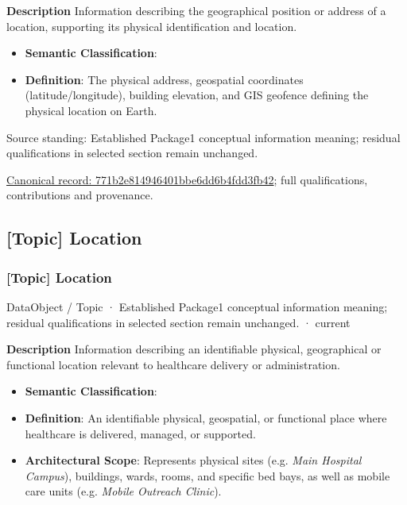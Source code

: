 \textbf{Description}
Information describing the geographical position or address of a location, supporting its physical identification and location.



\begin{itemize}


\item \textbf{Semantic Classification}: \texttt{}

\item \textbf{Definition}: The physical address, geospatial coordinates (latitude/longitude), building elevation, and GIS geofence defining the physical location on Earth.

\end{itemize}


Source standing: Established Package1 conceptual information meaning; residual qualifications in selected section remain unchanged.


{\footnotesize \href{../../../../continuum/application/data-object/topic/771b2e814946401bbe6dd6b4fdd3fb42.md}{Canonical record: 771b2e814946401bbe6dd6b4fdd3fb42}; full qualifications, contributions and provenance.}\par
\subsection{[Topic] Location}

\subsubsection{[Topic] Location}

\label{element:9ee4df4d76864bb1ac90fe1077c56c6f}
{\small DataObject / Topic · Established Package1 conceptual information meaning; residual qualifications in selected section remain unchanged. · current}\par

\textbf{Description}
Information describing an identifiable physical, geographical or functional location relevant to healthcare delivery or administration.



\begin{itemize}


\item \textbf{Semantic Classification}: \texttt{}

\item \textbf{Definition}: An identifiable physical, geospatial, or functional place where healthcare is delivered, managed, or supported.

\item \textbf{Architectural Scope}: Represents physical sites (e.g. \emph{Main Hospital Campus}), buildings, wards, rooms, and specific bed bays, as well as mobile care units (e.g. \emph{Mobile Outreach Clinic}).

\end{itemize}


